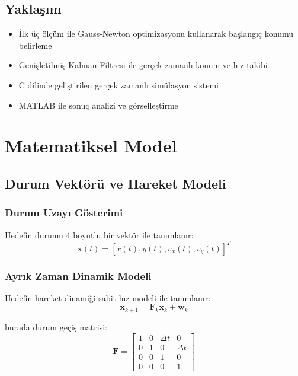 \documentclass[12pt,a4paper]{article}
\begin{document}
\subsection{Yakla\c{s}{\i}m}
\begin{itemize}
    \item İlk üç ölçüm ile Gauss-Newton optimizasyonu kullanarak başlangıç konumu belirleme
    \item Genişletilmiş Kalman Filtresi ile gerçek zamanlı konum ve hız takibi
    \item C dilinde geliştirilen gerçek zamanlı simülasyon sistemi
    \item MATLAB ile sonuç analizi ve görselleştirme
\end{itemize}

\section{Matematiksel Model}

\subsection{Durum Vektörü ve Hareket Modeli}

\subsubsection{Durum Uzayı Gösterimi}
Hedefin durumu 4 boyutlu bir vektör ile tanımlanır:
\begin{equation}
\mathbf{x}(t) = [x(t), y(t), v_x(t), v_y(t)]^T
\end{equation}

\subsubsection{Ayrık Zaman Dinamik Modeli}
Hedefin hareket dinamiği sabit hız modeli ile tanımlanır:
\begin{equation}
\mathbf{x}_{k+1} = \mathbf{F}_k \mathbf{x}_k + \mathbf{w}_k
\end{equation}

burada durum geçiş matrisi:
\begin{equation}
\mathbf{F} = \begin{bmatrix}
1 & 0 & \Delta t & 0 \\
0 & 1 & 0 & \Delta t \\
0 & 0 & 1 & 0 \\
0 & 0 & 0 & 1
\end{bmatrix}
\end{equation}
\end{document}
